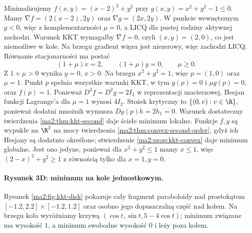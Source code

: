 \begin{przyklad}
\label{ma2:ex:kkt-disk}
Minimalizujemy $f(x,y)=(x-2)^2+y^2$ przy
$g(x,y)=x^2+y^2-1\le0$. Mamy
$\nabla f=(2(x-2),2y)$ oraz $\nabla g=(2x,2y)$.
W punkcie wewnętrznym $g<0$, więc z komplementarności
$\mu=0$, a LICQ dla pustej rodziny aktywnej zachodzi.
Warunek KKT wymagałby $\nabla f=0$, czyli $(x,y)=(2,0)$,
co jest niemożliwe w kole. Na brzegu gradient
więzu jest niezerowy, więc zachodzi LICQ.
Równanie stacjonarności ma postać
\[
 (1+\mu)x=2,\qquad (1+\mu)y=0,\qquad \mu\ge0.
\]
Z $1+\mu>0$ wynika $y=0$, $x>0$. Na brzegu
$x^2+y^2=1$, więc $p=(1,0)$ oraz $\mu=1$.
Punkt $p$ spełnia wszystkie warunki KKT, w tym
$g(p)=0$ i $\mu g(p)=0$, oraz $f(p)=1$.
Ponieważ $D^2f=D^2g=2I_2$ w reprezentacji macierzowej,
Hesjan funkcji Lagrange'a dla $\mu=1$ wynosi $4I_2$. Stożek krytyczny to
$\{(0,v):v\in\R\}$, ponieważ dodatni mnożnik
wymusza $Dg(p)h=2h_1=0$. Warunek dostateczny
twierdzenia \ref{ma2:thm:kkt-second} daje
ścisłe minimum lokalne. Funkcje $f,g$ są wypukłe na $\R^2$ na mocy
twierdzenia \ref{ma2:thm:convex-second-order},
gdyż ich Hesjany są dodatnio określone; stwierdzenie
\ref{ma2:prop:kkt-convex} daje minimum globalne.
Jest ono jedyne, ponieważ dla $x^2+y^2\le1$ mamy
$x\le1$, więc $(2-x)^2+y^2\ge1$ z równością
tylko dla $x=1,y=0$.
\end{przyklad}

\paragraph{Rysunek 3D: minimum na kole jednostkowym.}
Rysunek \ref{ma2:fig:kkt-disk} pokazuje cały fragment
paraboloidy nad prostokątem $[-1.2,2.2]\times[-1.2,1.2]$
oraz osobno jego dopuszczalną część nad kołem.
Na brzegu koła wyróżniamy krzywą
$(\cos t,\sin t,5-4\cos t)$; minimum związane
ma wysokość $1$, a minimum swobodne wysokość $0$
i leży poza kołem.


